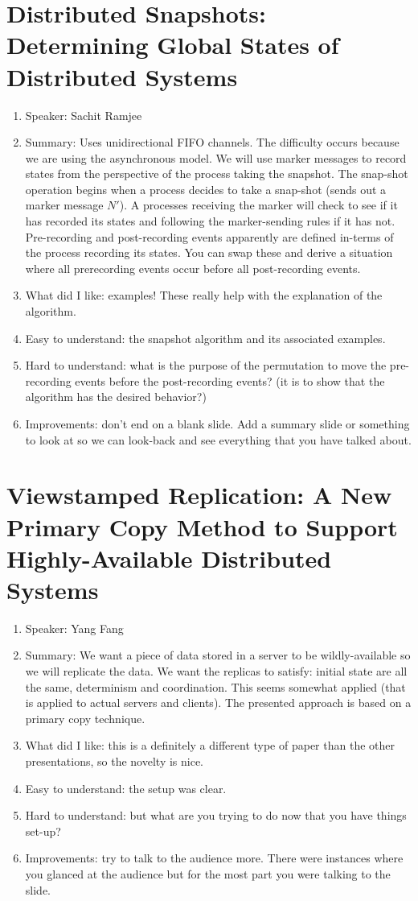 \documentclass[twoside]{article}
\begin{document}
\section{Distributed Snapshots: Determining Global States of Distributed Systems}
\begin{enumerate}
\item Speaker: Sachit Ramjee
\item Summary: Uses unidirectional FIFO channels. The difficulty occurs because we are using the asynchronous model. We will use marker messages to record states from the perspective of the process taking the snapshot. The snap-shot operation begins when a process decides to take a snap-shot (sends out a marker message $N'$). A processes receiving the marker will check to see if it has recorded its states and following the marker-sending rules if it has not. Pre-recording and post-recording events apparently are defined in-terms of the process recording its states. You can swap these and derive a situation where all prerecording events occur before all post-recording events.
\item What did I like: examples! These really help with the explanation of the algorithm.
\item Easy to understand: the snapshot algorithm and its associated examples.
\item Hard to understand: what is the purpose of the permutation to move the pre-recording events before the post-recording events? (it is to show that the algorithm has the desired behavior?)
\item Improvements: don't end on a blank slide. Add a summary slide or something to look at so we can look-back and see everything that you have talked about.
\end{enumerate}

\section{Viewstamped Replication: A New Primary Copy Method to Support Highly-Available Distributed Systems}
\begin{enumerate}
\item Speaker: Yang Fang
\item Summary: We want a piece of data stored in a server to be wildly-available so we will replicate the data. We want the replicas to satisfy: initial state are all the same, determinism and coordination. This seems somewhat applied (that is applied to actual servers and clients). The presented approach is based on a primary copy technique.
\item What did I like: this is a definitely a different type of paper than the other presentations, so the novelty is nice.
\item Easy to understand: the setup was clear.
\item Hard to understand: but what are you trying to do now that you have things set-up?
\item Improvements: try to talk to the audience more. There were instances where you glanced at the audience but for the most part you were talking to the slide. 
\end{enumerate}
\end{document}
